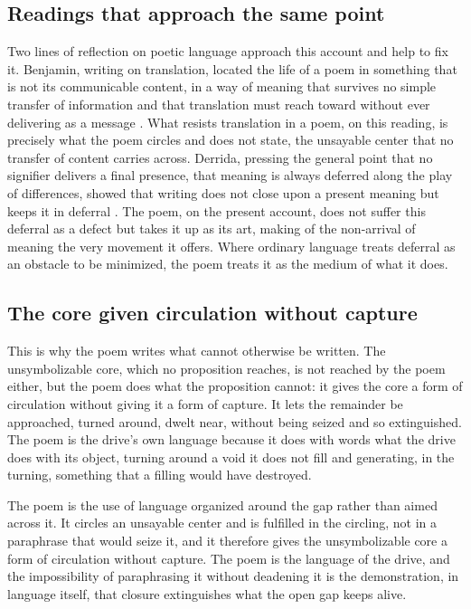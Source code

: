 \subsection*{Readings that approach the same point}

Two lines of reflection on poetic language approach this account and help to fix it. Benjamin, writing on translation, located the life of a poem in something that is not its communicable content, in a way of meaning that survives no simple transfer of information and that translation must reach toward without ever delivering as a message \parencite{benjamin1968task}. What resists translation in a poem, on this reading, is precisely what the poem circles and does not state, the unsayable center that no transfer of content carries across. Derrida, pressing the general point that no signifier delivers a final presence, that meaning is always deferred along the play of differences, showed that writing does not close upon a present meaning but keeps it in deferral \parencite{derrida1978writing}. The poem, on the present account, does not suffer this deferral as a defect but takes it up as its art, making of the non-arrival of meaning the very movement it offers. Where ordinary language treats deferral as an obstacle to be minimized, the poem treats it as the medium of what it does.

\subsection*{The core given circulation without capture}

This is why the poem writes what cannot otherwise be written. The unsymbolizable core, which no proposition reaches, is not reached by the poem either, but the poem does what the proposition cannot: it gives the core a form of circulation without giving it a form of capture. It lets the remainder be approached, turned around, dwelt near, without being seized and so extinguished. The poem is the drive's own language because it does with words what the drive does with its object, turning around a void it does not fill and generating, in the turning, something that a filling would have destroyed.

\begin{claim}
The poem is the use of language organized around the gap rather than aimed across it. It circles an unsayable center and is fulfilled in the circling, not in a paraphrase that would seize it, and it therefore gives the unsymbolizable core a form of circulation without capture. The poem is the language of the drive, and the impossibility of paraphrasing it without deadening it is the demonstration, in language itself, that closure extinguishes what the open gap keeps alive.
\end{claim}

